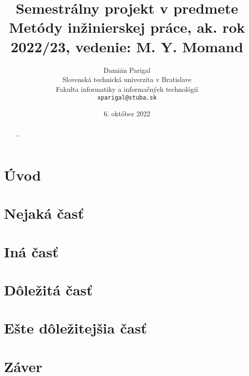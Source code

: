 \documentclass[10pt,twoside,slovak,coursepaper]{article}
\title{Semestrálny projekt v predmete Metódy inžinierskej práce, ak. rok 2022/23, vedenie: M. Y. Momand} %
\author{Damián Parigal\\[2pt]
	{\small Slovenská technická univerzita v Bratislave}\\
	{\small Fakulta informatiky a informačných technológií}\\
	{\small \texttt{xparigal@stuba.sk}}
	}
\date{\small 6. október 2022} %
\begin{document}
\maketitle

\begin{abstract}
\ldots
\end{abstract}



\section{Úvod}



\section{Nejaká časť} \label{nejaka}




\section{Iná časť} \label{ina}




\section{Dôležitá časť} \label{dolezita}




\section{Ešte dôležitejšia časť} \label{dolezitejsia}




\section{Záver} \label{zaver} %






\end{document}
